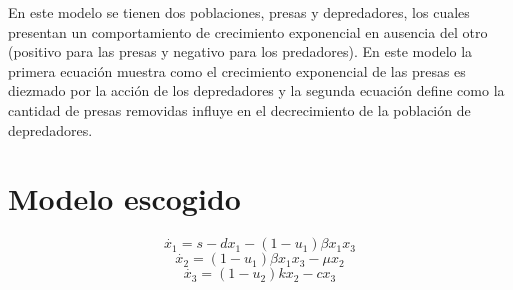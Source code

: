 \documentclass{article}
\begin{document}
        \vspace{0.5cm}

        En este modelo se tienen dos poblaciones, presas y depredadores, los
        cuales presentan un comportamiento de crecimiento exponencial en
        ausencia del otro (positivo para las presas y negativo para los
        predadores). En este modelo la primera ecuación muestra como el
        crecimiento exponencial de las presas es diezmado por la acción de los
        depredadores y la segunda ecuación define como la cantidad de presas
        removidas influye en el decrecimiento de la población de depredadores.

\newpage

\section{Modelo escogido}

    \Large
    \begin{equation}
    \dot{x_1} = s -dx_1 - (1-u_1) \beta x_1 x_3
    \end{equation}
    \begin{equation}
    \dot{x_2} = (1-u_1) \beta x_1 x_3 - \mu x_2
    \end{equation}
    \begin{equation} \label{eq:3}
    \dot{x_3} = (1-u_2) k x_2 - c x_3
    \end{equation}
    \normalsize

\vspace{1cm}
\end{document}
